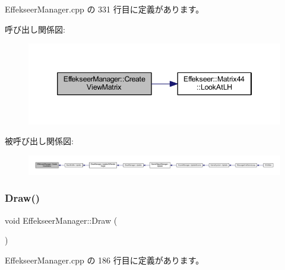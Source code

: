  Effekseer\+Manager.\+cpp の 331 行目に定義があります。

呼び出し関係図\+:\nopagebreak
\begin{figure}[H]
\begin{center}
\leavevmode
\includegraphics[width=346pt]{class_effekseer_manager_ad36867f996af58d4b788a17cf25244a7_cgraph}
\end{center}
\end{figure}
被呼び出し関係図\+:
\nopagebreak
\begin{figure}[H]
\begin{center}
\leavevmode
\includegraphics[width=350pt]{class_effekseer_manager_ad36867f996af58d4b788a17cf25244a7_icgraph}
\end{center}
\end{figure}
\mbox{\label{class_effekseer_manager_a0c9155e72b0552e5138e68be682a63a4}} 
\subsubsection{\texorpdfstring{Draw()}{Draw()}}
{\footnotesize\ttfamily void Effekseer\+Manager\+::\+Draw (\begin{DoxyParamCaption}{ }\end{DoxyParamCaption})\hspace{0.3cm}{\ttfamily [static]}}



 Effekseer\+Manager.\+cpp の 186 行目に定義があります。


